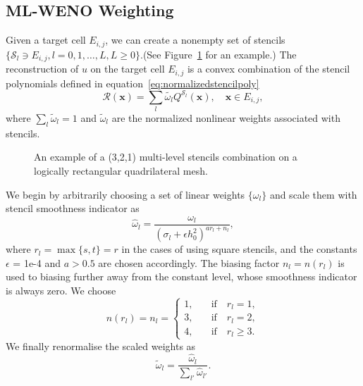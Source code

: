 \subsection{ML-WENO Weighting}
Given a target cell $E_{i,j}$, we can create a nonempty set of stencils $\{\mathcal{S}_l \ni E_{i,j}, l = 0,1, \dots, L, L \geq 0\}$.(See Figure~\ref{fig:quadmesh} for an example.)
The reconstruction of $u$ on the target cell $E_{i,j}$ is a convex combination of the stencil polynomials defined in equation~\eqref{eq:normalizedstencilpoly}
\begin{equation}\label{eq:reconstruction}
\mathcal{R}(\mathbf{x}) = \sum_{l} \tilde{\omega_l} Q^{\mathcal{S}_l}(\mathbf{x}), \quad \mathbf{x} \in E_{i,j},
\end{equation}
where $\sum_l \tilde{\omega}_l = 1$ and $\tilde{\omega}_l$ are the normalized nonlinear weights associated with stencils.
\begin{figure}[htb]
\centering

\caption{An example of a (3,2,1) multi-level stencils combination on a logically rectangular 
quadrilateral mesh.\label{fig:quadmesh}}
\end{figure}
We begin by arbitrarily choosing a set of linear weights $\{\omega_l\}$ and scale them with stencil smoothness indicator as
\begin{equation}\label{eq:nonlinearwgts}
\hat{\omega}_l = \frac{\omega_l}{(\sigma_l + \epsilon h_0^2)^{ar_l + n_l}},
\end{equation}
where $r_l = \max\{s,t\} = r$ in the cases of using square stencils, 
and the constants $\epsilon$ = 1e-4 and $a > 0.5$ are chosen accordingly. The biasing factor $n_l = n(r_l)$ 
is used to biasing further away from the constant level, whose smoothness indicator is always zero. We choose 
\begin{equation}\label{eq:biasingfctor}
n(r_l) = n_l = \begin{cases}
1, \quad &\text{if} \quad r_l = 1,\\
3, \quad &\text{if} \quad r_l = 2,\\
4, \quad &\text{if} \quad r_l \geq 3.
\end{cases}
\end{equation}
We finally renormalise the scaled weights as
\begin{equation}\label{eq:normalizednonlinearwgts}
\tilde{\omega}_l = \frac{\hat{\omega}_l}{\sum_{l'} \hat{\omega}_{l'}}.
\end{equation}

